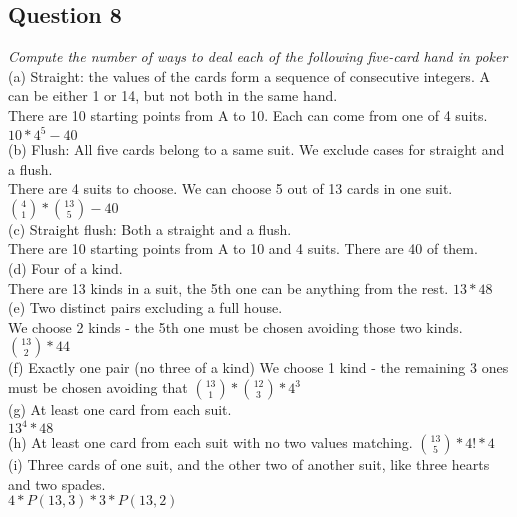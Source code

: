 \documentclass{article}
\begin{document}
\subsection{Question 8}
\emph{Compute the number of ways to deal each of the following five-card hand in poker}
\\
\medskip
(a) Straight: the values of the cards form a sequence of consecutive integers. A can be either 1 or 14, but not both in the same hand.
\\
\medskip
There are 10 starting points from A to 10. Each can come from one of 4 suits.
$10*4^5 - 40$
\\
\medskip
(b) Flush: All five cards belong to a same suit. We exclude cases for straight and a flush.
\\
\medskip
There are 4 suits to choose. We can choose 5 out of 13 cards in one suit.
${4\choose1}*{13\choose5} - 40$
\\
\medskip
(c) Straight flush: Both a straight and a flush.
\\
\medskip
There are 10 starting points from A to 10 and 4 suits. There are 40 of them.
\\
\medskip
(d) Four of a kind.
\\
\medskip
There are 13 kinds in a suit, the 5th one can be anything from the rest.
$13*48$
\\
\medskip
(e) Two distinct pairs excluding a full house.
\\
\medskip
We choose 2 kinds - the 5th one must be chosen avoiding those two kinds.
${13\choose2}* 44$
\\
\medskip
(f) Exactly one pair (no three of a kind)
We choose 1 kind - the remaining 3 ones must be chosen avoiding that
${13\choose1}*{12\choose3}*4^3$
\\
\medskip
(g) At least one card from each suit.
\\
\medskip
$13^4*48$
\\
\medskip
(h) At least one card from each suit with no two values matching.
${13\choose5}*4!*4$
\\
\medskip
(i) Three cards of one suit, and the other two of another suit, like three hearts and two spades.
\\
\medskip
$4*P(13, 3)*3*P(13, 2)$
\\
\bigskip
\end{document}
